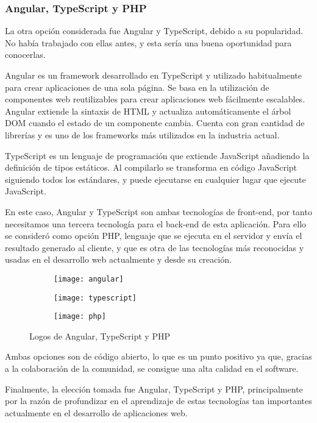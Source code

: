 \subsubsection{Angular, TypeScript y PHP}
La otra opción considerada fue Angular y TypeScript, debido a su popularidad. No había trabajado con ellas antes, y esta sería una buena oportunidad para conocerlas.
\par Angular es un framework desarrollado en TypeScript y utilizado habitualmente para crear aplicaciones de una sola página. Se basa en la utilización de componentes web reutilizables para crear aplicaciones web fácilmente escalables. Angular extiende la sintaxis de HTML y actualiza automáticamente el árbol DOM cuando el estado de un componente cambia. Cuenta con gran cantidad de librerías y es uno de los frameworks más utilizados en la industria actual\cite{Angular}.
\par TypeScript es un lenguaje de programación que extiende JavaScript añadiendo la definición de tipos estáticos. Al compilarlo se transforma en código JavaScript siguiendo todos los estándares, y puede ejecutarse en cualquier lugar que ejecute JavaScript\cite{TypeScript}.
\par En este caso, Angular y TypeScript son ambas tecnologías de front-end, por tanto necesitamos una tercera tecnología para el back-end de esta aplicación. Para ello se consideró como opción PHP, lenguaje que se ejecuta en el servidor y envía el resultado generado al cliente, y que es otra de las tecnologías más reconocidas y usadas en el desarrollo web actualmente y desde su creación.
\begin{figure}[H]
	\centering
	\begin{subfigure}{0.2\textwidth}
	\centering
	\texttt{[image: angular]}
	\end{subfigure}
	\begin{subfigure}{0.3\textwidth}
	\centering
	\texttt{[image: typescript]}
	\end{subfigure}
	\begin{subfigure}{0.3\textwidth}
	\centering
	\texttt{[image: php]}
	\end{subfigure}
	\caption {Logos de Angular, TypeScript y PHP}
\end{figure}
\noindent Ambas opciones son de código abierto, lo que es un punto positivo ya que, gracias a la colaboración de la comunidad, se consigue una alta calidad en el software. 
\par Finalmente, la elección tomada fue Angular, TypeScript y PHP, principalmente por la razón de profundizar en el aprendizaje de estas tecnologías tan importantes actualmente en el desarrollo de aplicaciones web.

